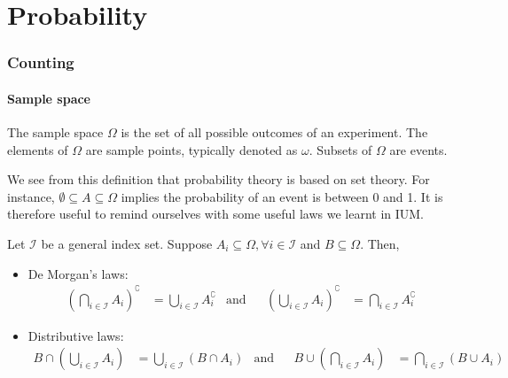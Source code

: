 \documentclass[11pt]{article}
\begin{document}
\maketitle{}
\tableofcontents{}
\pagebreak
\part{Probability}
\section{Counting}
\subsection{Sample space}
\begin{definition}
  The sample space \(\Omega\) is the set of all possible outcomes of an experiment. The elements of \(\Omega\) are sample points, typically denoted as \(\omega\). Subsets of \(\Omega\) are events.
\end{definition}

We see from this definition that probability theory is based on set theory. For instance, \(\emptyset \subseteq A \subseteq \Omega\) implies the probability of an event is between 0 and 1. It is therefore useful to remind ourselves with some useful laws we learnt in IUM.

\begin{proposition}
  Let \(\mathcal{I}\) be a general index set. Suppose \(A_i \subseteq \Omega, \forall i\in \mathcal{I}\) and \(B\subseteq \Omega\). Then,
  \begin{itemize}
    \item De Morgan's laws: 
    \begin{align*}
      \left(\bigcap_{i\in\mathcal{I}}A_i \right)^\complement
      &= \bigcup_{i\in\mathcal{I}}A_i^\complement
      & \text{and}& 
      & \left(\bigcup_{i\in\mathcal{I}}A_i \right)^\complement &= \bigcap_{i\in\mathcal{I}}A_i^\complement
    \end{align*}
    \item Distributive laws:
    \begin{align*}
      B \cap \left(\bigcup_{i\in\mathcal{I}}A_i \right)
      &= \bigcup_{i\in\mathcal{I}}(B \cap A_i)
      & \text{and}& 
      & B \cup \left(\bigcap_{i\in\mathcal{I}}A_i \right)
      &= \bigcap_{i\in\mathcal{I}}(B \cup A_i)
    \end{align*}
  \end{itemize}
\end{proposition}
\end{document}
